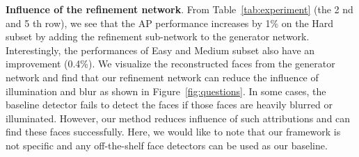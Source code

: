 \documentclass[10pt,twocolumn,letterpaper]{article}
\begin{document}
\textbf{Influence of the refinement network}. From Table~\ref{tab:experiment} (the 2
nd and 5
th row), we see that the AP performance
increases by 1\% on the Hard subset by adding the refinement
sub-network to the generator network. Interestingly,
the performances of Easy and Medium subset also have an
improvement (0.4\%). We visualize the reconstructed faces
from the generator network and find that our refinement network
can reduce the influence of illumination and blur as
shown in Figure~\ref{fig:questions}. In some cases, the baseline detector fails
to detect the faces if those faces are heavily blurred or illuminated.
However, our method reduces influence of such
attributions and can find these faces successfully. Here, we
would like to note that our framework is not specific and
any off-the-shelf face detectors can be used as our baseline.

{\small


}
\end{document}
